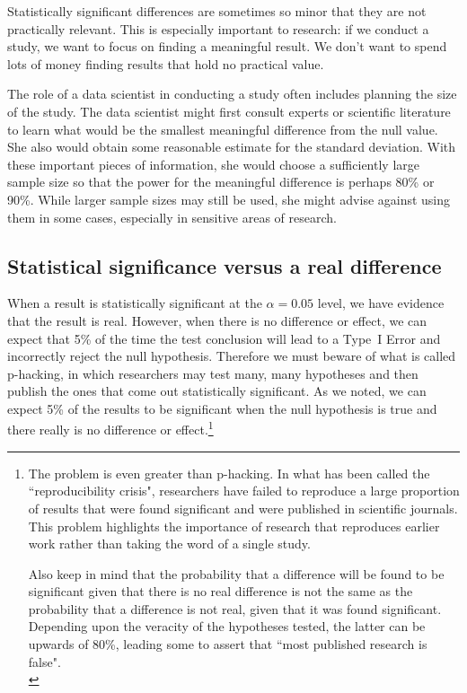 Statistically significant differences are sometimes so minor that they are not practically relevant. This is especially important to research: if we conduct a study, we want to focus on finding a meaningful result. We don't want to spend lots of money finding results that hold no practical value.

The role of a data scientist in conducting a study often includes planning the size of the study. The data scientist might first consult experts or scientific literature to learn what would be the smallest meaningful difference from the null value. She also would obtain some reasonable estimate for the standard deviation. With these important pieces of information, she would choose a sufficiently large sample size so that the power for the meaningful difference is perhaps 80\% or 90\%. While larger sample sizes may still be used, she might advise against using them in some cases, especially in sensitive areas of research.

\subsection{Statistical significance versus a real difference}

When a result is statistically significant at the $\alpha=0.05$ level, we have evidence that the result is real.
However, when there is no difference or effect, we can expect that 5\% of the time the test conclusion will lead to a Type~I Error and incorrectly reject the null hypothesis.
Therefore we must beware of what is called p-hacking, in which researchers may test many, many hypotheses and then publish the ones that come out statistically significant.
As we noted, we can expect 5\% of the results to be significant when the null hypothesis is true and there really is no difference or effect.\footnote{
The problem is even greater than p-hacking.  In what has been called the ``reproducibility crisis", researchers have failed to reproduce a large proportion of results that were found significant and were published in scientific journals.
This problem highlights the importance of research that
reproduces earlier work rather than taking the word of
a single study.

Also keep in mind that the probability that a difference will be found to be significant given that there is no real difference is not the same as the probability that a difference is not real, given that it was found significant.
Depending upon the veracity of the hypotheses tested, the latter can be upwards of 80\%, leading some to assert that ``most published research is false". \\
}



